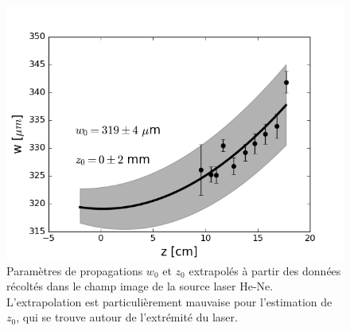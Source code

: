 \documentclass[10pt,letterpaper,twocolumn]{article}
\begin{document}
\begin{figure}[H]
\centering
\includegraphics[width=\linewidth]{figures/w1.png}
\caption{Paramètres de propagations $w_0$ et $z_0$ extrapolés à partir des données récoltés dans le champ image de la source laser He-Ne. L'extrapolation est particulièrement mauvaise pour l'estimation de $z_0$, qui se trouve autour de l'extrémité du laser. }
\label{fig:w1}
\end{figure}
\end{document}
